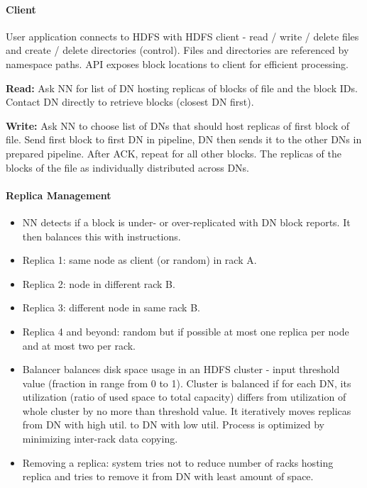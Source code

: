 \paragraph{Client}
User application connects to HDFS with HDFS client - read / write / delete files and create / delete directories (control). Files and directories are referenced by namespace paths. API exposes block locations to client for efficient processing.

\textbf{Read:} Ask NN for list of DN hosting replicas of blocks of file and the block IDs. Contact DN directly to retrieve blocks (closest DN first).

\textbf{Write:} Ask NN to choose list of DNs that should host replicas of first block of file. Send first block to first DN in pipeline, DN then sends it to the other DNs in prepared pipeline. After ACK, repeat for all other blocks. The replicas of the blocks of the file as individually distributed across DNs.


\paragraph{Replica Management}
\begin{itemize}
    \item NN detects if a block is under- or over-replicated with DN block reports. It then balances this with instructions.
    \item Replica 1: same node as client (or random) in rack A.
    \item Replica 2: node in different rack B.
    \item Replica 3: different node in same rack B.
    \item Replica 4 and beyond: random but if possible at most one replica per node and at most two per rack.
    \item Balancer balances disk space usage in an HDFS cluster - input threshold value (fraction in range from 0 to 1). Cluster is balanced if for each DN, its utilization (ratio of used space to total capacity) differs from utilization of whole cluster by no more than threshold value. It iteratively moves replicas from DN with high util. to DN with low util. Process is optimized by minimizing inter-rack data copying.
    \item Removing a replica: system tries not to reduce number of racks hosting replica and tries to remove it from DN with least amount of space.
\end{itemize}

